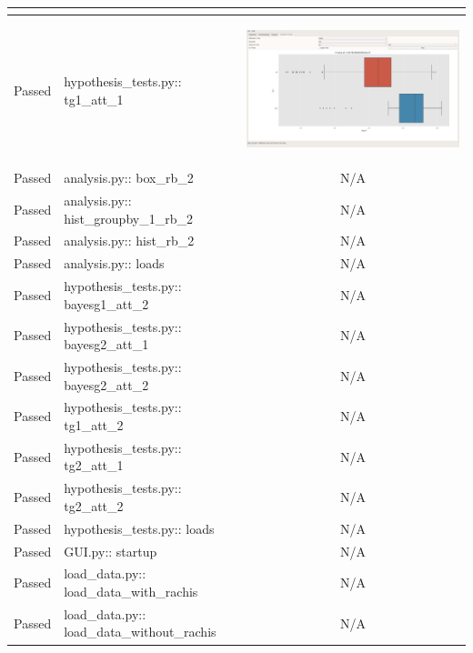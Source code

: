 \documentclass[11pt]{report}
\begin{document}
\begin{longtable}{|l|p{4.4cm}|C|}
\begin{center}
\end{center}\\
\hline
\color{ForestGreen}Passed & hypothesis\_tests.py:: tg1\_att\_1 & \begin{center}
\includegraphics[width=.9\linewidth]{./images/Screenshots/hypothesis_ttest_g1_att_1.png}
\end{center}\\
\hline
\color{ForestGreen}Passed & analysis.py:: box\_rb\_2 & N/A\\
\hline
\color{ForestGreen}Passed & analysis.py:: hist\_groupby\_1\_rb\_2 & N/A\\
\hline
\color{ForestGreen}Passed & analysis.py:: hist\_rb\_2 & N/A\\
\hline
\color{ForestGreen}Passed & analysis.py:: loads & N/A\\
\hline
\color{ForestGreen}Passed & hypothesis\_tests.py:: bayesg1\_att\_2 & N/A\\
\hline
\color{ForestGreen}Passed & hypothesis\_tests.py:: bayesg2\_att\_1 & N/A\\
\hline
\color{ForestGreen}Passed & hypothesis\_tests.py:: bayesg2\_att\_2 & N/A\\
\hline
\color{ForestGreen}Passed & hypothesis\_tests.py:: tg1\_att\_2 & N/A\\
\hline
\color{ForestGreen}Passed & hypothesis\_tests.py:: tg2\_att\_1 & N/A\\
\hline
\color{ForestGreen}Passed & hypothesis\_tests.py:: tg2\_att\_2 & N/A\\
\hline
\color{ForestGreen}Passed & hypothesis\_tests.py:: loads & N/A\\
\hline
\color{ForestGreen}Passed & GUI.py:: startup & N/A\\
\hline
\color{ForestGreen}Passed & load\_data.py:: load\_data\_with\_rachis & N/A\\
\hline
\color{ForestGreen}Passed & load\_data.py:: load\_data\_without\_rachis & N/A\\

\end{longtable}
\end{document}
